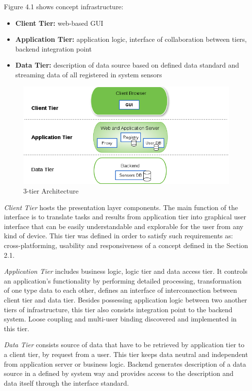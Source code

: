   Figure 4.1 shows concept infrastructure:
  \begin{itemize}
  \item \textbf{Client Tier:} web-based GUI
  \item \textbf{Application Tier:} application logic, interface of collaboration between tiers, backend integration point
  \item \textbf{Data Tier:} description of data source based on defined data standard and streaming data of all registered in system sensors
  \end{itemize} 
  \begin{figure}[!ht]
  \centering
  \includegraphics[scale=0.7]{images/3tier.png}   
  \caption[3-tier Architecture]{3-tier Architecture}
  \label{img:3-tier Architecture}                           
  \end{figure}

  \emph{Client Tier} hosts the presentation layer components. The main function of the interface is to translate tasks and results from application tier into graphical user interface that can be easily understandable and explorable for the user from any kind of device. This tier was defined in order to satisfy such requirements as: cross-platforming, usability and responsiveness of a concept defined in the Section 2.1.

  \emph{Application Tier} includes business logic, logic tier and data access tier. It controls an application's functionality by performing detailed processing, transformation of one type data to each other, defines an interface of interconnection between client tier and data tier. Besides possessing application logic between two another tiers of infrastructure, this tier also consists integration point to the backend system. Loose coupling and multi-user binding discovered and implemented in this tier.

  \emph{Data Tier} consists source of data that have to be retrieved by application tier to a client tier, by request from a user. This tier keeps data neutral and independent from application server or business logic. Backend generates description of a data source in a defined by system way and provides access to the description and data itself through the interface standard.

